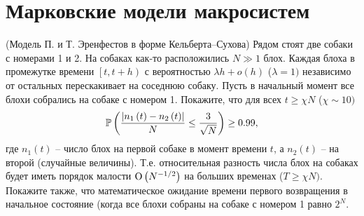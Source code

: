 \section{Марковские модели макросистем}
\label{macrosystems}

\begin{problem}\Star(Модель П. и Т. Эренфестов в форме Кельберта--Сухова)
Рядом стоят две собаки с номерами 
1 и 2. На собаках как-то расположились 
$N\gg 1$ блох. Каждая блоха в промежутке времени $\left[ {t,t+h} \right)$ с 
вероятностью $\lambda h+o\left( h \right)$ ($\lambda =1)$ независимо от 
остальных перескакивает на соседнюю собаку. Пусть в начальный момент все 
блохи собрались на собаке с номером 1. Покажите, что для 
всех $t\ge \chi N$ ($\chi \sim 10)$
\[
\mathrm{{\mathbb P}}\left( {\frac{\left| {n_1 \left( t \right)-n_2 \left( t \right)} 
\right|}{N}\le \frac{3}{\sqrt N }} \right)\ge 0.99,
\]
где $n_1 \left( t \right)$ -- число блох на первой собаке в момент времени 
$t$, а $n_2 \left( t \right)$ -- на второй (случайные величины). Т.е. 
относительная разность числа блох на собаках будет иметь порядок малости 
${\rm O}\left(N^{-1/2}\right)$ на больших временах ($T\ge 
\chi N)$. Покажите также, что математическое ожидание времени первого 
возвращения в начальное состояние (когда все блохи собраны на собаке с 
номером 1 равно $2^N$.

\end{problem}

